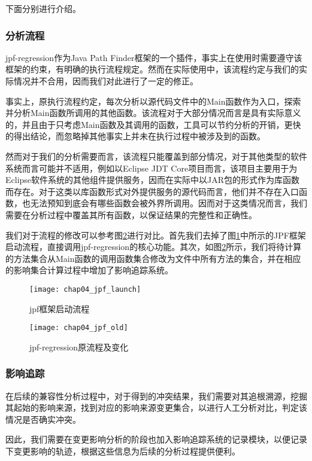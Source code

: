 下面分别进行介绍。

\subsubsection{分析流程}
jpf-regression作为Java Path Finder框架的一个插件，事实上在使用时需要遵守该框架的约束，有明确的执行流程规定。然而在实际使用中，该流程约定与我们的实际情况并不合用，因而我们对此进行了一定的修正。

事实上，原执行流程约定，每次分析以源代码文件中的Main函数作为入口，探索并分析Main函数所调用的其他函数。该流程对于大部分情况而言是具有实际意义的，并且由于只考虑Main函数及其调用的函数，工具可以节约分析的开销，更快的得出结论，而忽略掉其他事实上并未在执行过程中被涉及到的函数。

然而对于我们的分析需要而言，该流程只能覆盖到部分情况，对于其他类型的软件系统而言可能并不适用，例如以Eclipse JDT Core项目而言，该项目主要用于为Eclipse软件系统的其他组件提供服务，因而在实际中以JAR包的形式作为库函数而存在。对于这类以库函数形式对外提供服务的源代码而言，他们并不存在入口函数，也无法预知到底会有哪些函数会被外界所调用。因而对于这类情况而言，我们需要在分析过程中覆盖其所有函数，以保证结果的完整性和正确性。

我们对于流程的修改可以参考图\ref {impact_process_old}进行对比。首先我们去掉了图\ref {impact_process}中所示的JPF框架启动流程，直接调用jpf-regression的核心功能。其次，如图\ref {impact_process_old}所示，我们将待计算的方法集合从Main函数的调用函数集合修改为文件中所有方法的集合，并在相应的影响集合计算过程中增加了影响追踪系统。

\begin{figure}[H]
	\centering
	\texttt{[image: chap04\_jpf\_launch]}
	\caption {jpf框架启动流程}
	\label {impact_process}	
\end{figure}


\begin{figure}[H]
	\centering
	\texttt{[image: chap04\_jpf\_old]}
	\caption {jpf-regression原流程及变化}
	\label {impact_process_old}	
\end{figure}

\subsubsection{影响追踪}

在后续的兼容性分析过程中，对于得到的冲突结果，我们需要对其追根溯源，挖掘其起始的影响来源，找到对应的影响来源变更集合，以进行人工分析对比，判定该情况是否确实冲突。

因此，我们需要在变更影响分析的阶段也加入影响追踪系统的记录模块，以便记录下变更影响的轨迹，根据这些信息为后续的分析过程提供便利。

